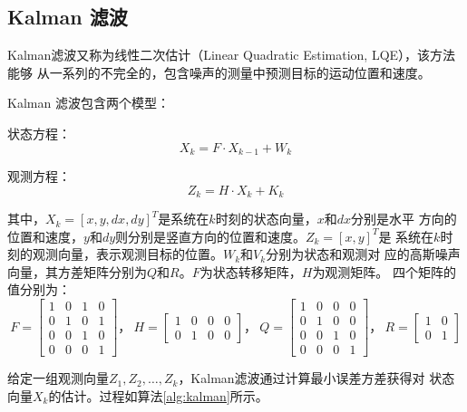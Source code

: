 \subsection{Kalman 滤波}
\label{sec:kalman}

Kalman滤波又称为线性二次估计（Linear Quadratic Estimation, LQE），该方法能够
从一系列的不完全的，包含噪声的测量中预测目标的运动位置和速度。

Kalman 滤波包含两个模型：

\begin{compactenum}
\item 状态方程：
  \begin{equation}
    \label{eq:state}
    X_{k}=F\cdot X_{k-1}+W_k
  \end{equation}
\item 观测方程：
  \begin{equation}
    \label{eq:observation}
    Z_{k}=H\cdot X_{k}+K_{k}
  \end{equation}
\end{compactenum}

其中，$X_k = [x,y,dx,dy]^{T}$是系统在$k$时刻的状态向量，$x$和$dx$分别是水平
方向的位置和速度，$y$和$dy$则分别是竖直方向的位置和速度。$Z_k=[x,y]^{T}$是
系统在$k$时刻的观测向量，表示观测目标的位置。$W_k$和$V_k$分别为状态和观测对
应的高斯噪声向量，其方差矩阵分别为$Q$和$R$。$F$为状态转移矩阵，$H$为观测矩阵。
四个矩阵的值分别为：$$F=\begin{bmatrix}
  1 & 0 & 1 & 0\\0 & 1 & 0 & 1 \\ 0 & 0 & 1 & 0\\ 0 & 0 & 0 & 1
\end{bmatrix}
\mbox{，}~
H = \begin{bmatrix}
  1 & 0 & 0 & 0\\0 & 1 & 0 & 0
\end{bmatrix}
\mbox{，}~
Q=\begin{bmatrix}
  1 & 0 & 0 & 0\\0 & 1 & 0 & 0 \\ 0 & 0 & 1 & 0\\ 0 & 0 & 0 & 1
\end{bmatrix}
\mbox{，}~
R = \begin{bmatrix}
  1 & 0 \\0 & 1 
\end{bmatrix}
$$

给定一组观测向量$Z_1, Z_2, \ldots, Z_k$，Kalman滤波通过计算最小误差方差获得对
状态向量$X_k$的估计。过程如算法\ref{alg:kalman}所示。

